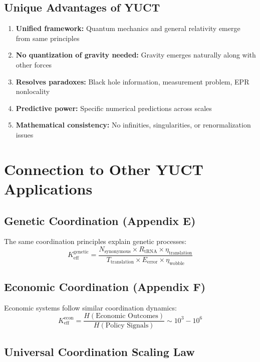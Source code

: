 \documentclass[12pt,a4paper]{article}
\theoremstyle{remark}
\begin{document}
	\subsection{Unique Advantages of YUCT}
	
	\begin{enumerate}
		\item \textbf{Unified framework:} Quantum mechanics and general relativity emerge from same principles
		
		\item \textbf{No quantization of gravity needed:} Gravity emerges naturally along with other forces
		
		\item \textbf{Resolves paradoxes:} Black hole information, measurement problem, EPR nonlocality
		
		\item \textbf{Predictive power:} Specific numerical predictions across scales
		
		\item \textbf{Mathematical consistency:} No infinities, singularities, or renormalization issues
	\end{enumerate}
	
	\section{Connection to Other YUCT Applications}
	\label{sec:connections}
	
	\subsection{Genetic Coordination (Appendix E)}
	
	The same coordination principles explain genetic processes:
	\[
	K_{\text{eff}}^{\text{genetic}} = \frac{N_{\text{synonymous}} \times R_{\text{tRNA}} \times \eta_{\text{translation}}}{T_{\text{translation}} \times E_{\text{error}} \times \eta_{\text{wobble}}}
	\]
	
	\subsection{Economic Coordination (Appendix F)}
	
	Economic systems follow similar coordination dynamics:
	\[
	K_{\text{eff}}^{\text{econ}} = \frac{H(\text{Economic Outcomes})}{H(\text{Policy Signals})} \sim 10^3-10^6
	\]
	
	\subsection{Universal Coordination Scaling Law}
	
\end{document}
